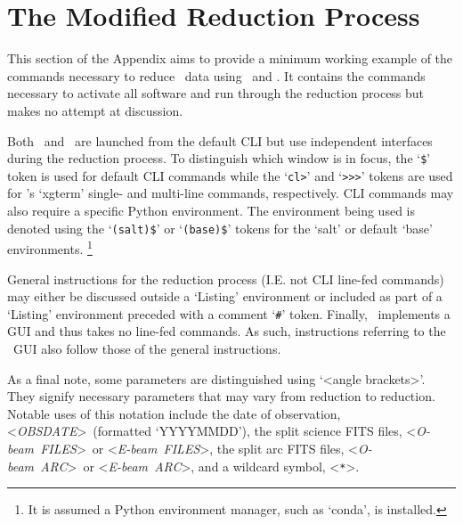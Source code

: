 \chapter{The Modified Reduction Process} \label{app:reduction}

\newcommand{\obj}{<\textit{OBJ}>}
\newcommand{\obsdate}{<\textit{OBSDATE}>}

\newcommand{\oarc}{<\textit{O-beam~ARC}>}
\newcommand{\earc}{<\textit{E-beam~ARC}>}
\newcommand{\ofiles}{<\textit{O-beam~FILES}>}
\newcommand{\efiles}{<\textit{E-beam~FILES}>}
\newcommand{\file}{<\textit{FILE(S)}>}

\newcommand{\id}{01\_identify.cl}
\newcommand{\reid}{02\_reidentify.cl}
\newcommand{\fit}{03\_fitcoords.cl}
\newcommand{\tran}{04\_transform.cl}

This section of the Appendix aims to provide a minimum working example of the commands necessary to reduce \polsalt\ data using \stops\ and \iraf. It contains the commands necessary to activate all software and run through the reduction process but makes no attempt at discussion.

Both \polsalt\ and \iraf\ are launched from the default \gls{CLI} but use independent interfaces during the reduction process. To distinguish which window is in focus, the `\texttt{\$}' token is used for default \gls{CLI} commands while the `\texttt{cl>}' and `\texttt{>\->\->}' tokens are used for \iraf's `xgterm' single- and multi-line commands, respectively. \gls{CLI} commands may also require a specific Python environment. The environment being used is denoted using the `\texttt{(salt)\$}' or `\texttt{(base)\$}' tokens for the `salt' or default `base' environments.%
\footnote{It is assumed a Python environment manager, such as `conda', is installed.}

General instructions for the reduction process (I.E. not \gls{CLI} line-fed commands) may either be discussed outside a `Listing' environment or included as part of a `Listing' environment preceded with a comment `\texttt{\#}' token. Finally, \polsalt\ implements a \gls{GUI} and thus takes no line-fed commands. As such, instructions referring to the \polsalt\ \gls{GUI} also follow those of the general instructions.

As a final note, some parameters are distinguished using `<angle brackets>'. They signify necessary parameters that may vary from reduction to reduction. Notable uses of this notation include the date of observation, \obsdate\ (formatted `YYYYMMDD'), the split science \gls{FITS} files, \ofiles\ or \efiles, the split arc \gls{FITS} files, \oarc\ or \earc, and a wildcard symbol, <\texttt{*}>.

